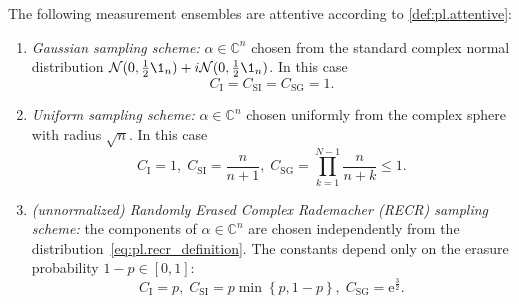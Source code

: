 \begin{proposition}%
  \label{prop:gauss+recr_requirements}
  The following measurement ensembles are attentive according to \cref{def:pl.attentive}:
  \begin{enumerate}
    \item\label{item:gauss+recr_requirements.gaussian} \emph{Gaussian sampling scheme:} $\alpha \in \mathbb{C}^n$ chosen from the standard complex normal distribution $\mathcal{N}(0,\tfrac{1}{2}\1_n)+ i \mathcal{N}(0,\tfrac{1}{2}\1_n)$.
    In this case
    \[
      C_\mathrm{I} = C_\mathrm{SI} = C_\mathrm{SG} = 1.
    \]

    \item\label{item:gauss+recr_requirements.uniform} \emph{Uniform sampling scheme:} $\alpha \in \mathbb{C}^n$ chosen uniformly from the complex sphere with radius $\sqrt{n}$.
    In this case
    \[
      C_\mathrm{I} = 1, \; C_\mathrm{SI} = \frac{n}{n+1}, \; C_\mathrm{SG} = \prod_{k=1}^{N-1} \frac{n}{n+k} \leq 1.
    \]

    \item\label{item:gauss+recr_requirements.recr} \emph{(unnormalized) Randomly Erased Complex Rademacher (RECR) sampling scheme:} the components of $\alpha \in \mathbb{C}^n$ are chosen independently from the distribution~\eqref{eq:pl.recr_definition}.
    The constants depend only on the erasure probability $1-p \in [0,1]$:
    \[
      C_\mathrm{I} = p,\; C_\mathrm{SI} = p \min \left\{p,1-p \right\}, \; C_\mathrm{SG} = \mathrm{e}^{\frac{3}{2}}.
    \]
  \end{enumerate}
\end{proposition}

